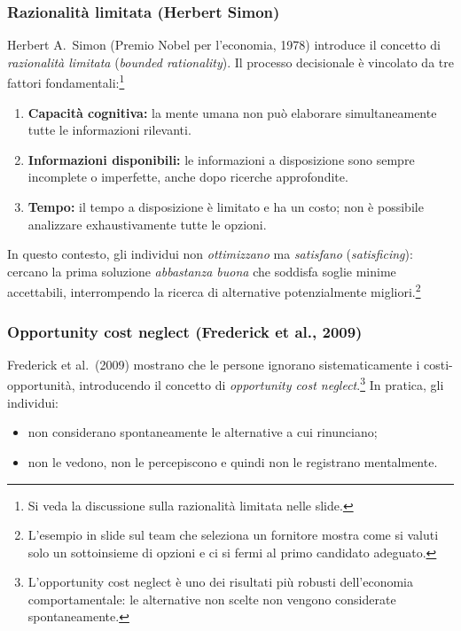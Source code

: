 \documentclass[a4paper,12pt]{article}
\begin{document}
	\subsubsection{Razionalità limitata (Herbert Simon)}
	
	Herbert A.~Simon (Premio Nobel per l'economia, 1978) introduce il concetto di \emph{razionalità limitata} (\emph{bounded rationality}).%
	Il processo decisionale è vincolato da tre fattori fondamentali:\footnote{Si veda la discussione sulla razionalità limitata nelle slide. }%
	\begin{enumerate}
		\item \textbf{Capacità cognitiva:} la mente umana non può elaborare simultaneamente tutte le informazioni rilevanti.
		\item \textbf{Informazioni disponibili:} le informazioni a disposizione sono sempre incomplete o imperfette, anche dopo ricerche approfondite.
		\item \textbf{Tempo:} il tempo a disposizione è limitato e ha un costo; non è possibile analizzare exhaustivamente tutte le opzioni.
	\end{enumerate}
	
	In questo contesto, gli individui non \emph{ottimizzano} ma \emph{satisfano} (\emph{satisficing}): cercano la prima soluzione \emph{abbastanza buona} che soddisfa soglie minime accettabili, interrompendo la ricerca di alternative potenzialmente migliori.\footnote{L'esempio in slide sul team che seleziona un fornitore mostra come si valuti solo un sottoinsieme di opzioni e ci si fermi al primo candidato adeguato. }%
	
	\subsubsection{Opportunity cost neglect (Frederick et al., 2009)}
	
	Frederick et al.~(2009) mostrano che le persone ignorano sistematicamente i costi-opportunità, introducendo il concetto di \emph{opportunity cost neglect}.\footnote{L'opportunity cost neglect è uno dei risultati più robusti dell'economia comportamentale: le alternative non scelte non vengono considerate spontaneamente.}%
	In pratica, gli individui:
	\begin{itemize}
		\item non considerano spontaneamente le alternative a cui rinunciano;
		\item non le vedono, non le percepiscono e quindi non le registrano mentalmente.
	\end{itemize}
	
\end{document}
